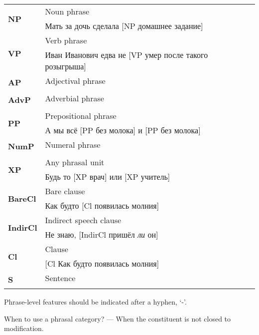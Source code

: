 \documentclass[a4paper,11pt, onecolumn,twoside]{article}
\begin{document}
\begin{tabular}{lll}
\toprule
\multirow{2}{*}{\textbf{NP}} & Noun phrase & \\
                    & Мать за дочь сделала [NP домашнее задание] & \\
\midrule
\multirow{2}{*}{\textbf{VP}} & Verb phrase & \\
                    & Иван Иванович едва не [VP умер после такого розыгрыша] & \\
\midrule
\multirow{2}{*}{\textbf{AP}} & Adjectival phrase & \\
                    & & \\
\midrule
\multirow{2}{*}{\textbf{AdvP}} & Adverbial phrase & \\
                    & & \\
\midrule
\multirow{2}{*}{\textbf{PP}} & Prepositional phrase & \\
                    & А мы всё [PP без молока] и [PP без молока] & \\
\midrule
\multirow{2}{*}{\textbf{NumP}} & Numeral phrase & \\
                    & & \\
\midrule
\multirow{2}{*}{\textbf{XP}} & Any phrasal unit & \\
                    & Будь то [XP врач] или [XP учитель] & \\
\midrule
\multirow{2}{*}{\textbf{BareCl}} & Bare clause & \\
                    & Как будто [Cl появилась молния] & \\
\midrule
\multirow{2}{*}{\textbf{IndirCl}} & Indirect speech clause & \\
                    & Не знаю, [IndirCl пришёл \emph{ли} он] & \\
\midrule
\multirow{2}{*}{\textbf{Cl}} & Clause & \\
                    & [Cl Как будто появилась молния] & \\
\midrule
\multirow{2}{*}{\textbf{S}} & Sentence & \\
                    & & \\
\bottomrule
\end{tabular}

Phrase-level features should be indicated after a hyphen, `-'.

When to use a phrasal category?  --- When the constituent is not closed to modification.
\end{document}
